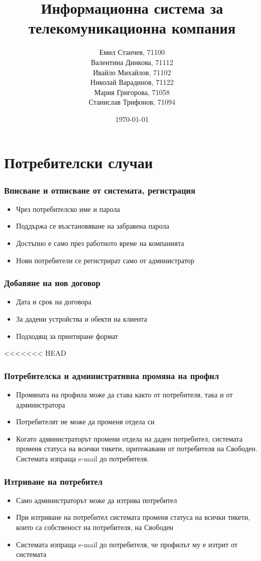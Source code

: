 \documentclass{beamer}
\title[ИС за телекомуникационна компания]{Информационна система за телекомуникационна компания}
\author{\tiny {Емил Станчев, 71100 \\
	Валентина Динкова, 71112 \\
	Ивайло Михайлов, 71102 \\
	Николай Варадинов, 71122 \\
	Мария Григорова, 71058 \\
	Станислав Трифонов, 71094 
	}
	}
\institute{ФМИ}
\date{\tiny{\today}}
\begin{document}
\begin{frame}
  \titlepage
\end{frame}

\section{Потребителски случаи}
\begin{frame}
  \frametitle{Вписване и отписване от системата, регистрация}
    \begin{itemize}
      \item Чрез потребителско име и парола
      \item Поддържа се възстановяване на забравена парола
      \item Достъпно е само през работното време на компанията
      \item Нови потребители се регистрират само от администратор
    \end{itemize}
\end{frame}

\begin{frame}
  \frametitle{Добавяне на нов договор}
    \begin{itemize}
	\item Дата и срок на договора
	\item За дадени устройства и обекти на клиента
	\item Подходящ за принтиране формат
    \end{itemize}
\end{frame}

<<<<<<< HEAD
\begin{frame}
  \frametitle{Потребителска и административна промяна на профил}
    \begin{itemize}
	\item Промяната на профила може да става както от потребителя, така и от администратора
	\item Потребителят не може да променя отдела си
	\item Когато администраторът промени отдела на даден потребител, системата променя статуса на всички тикети,
притежавани от потребителя на Свободен. Системата изпраща e-mail до потребителя.
    \end{itemize}
\end{frame}

\begin{frame}
  \frametitle{Изтриване на потребител}
    \begin{itemize}
	\item Само администраторът може да изтрива потребител
	\item При изтриване на потребител системата променя статуса на всички тикети,
 които са собственост на потребителя, на Свободен
	\item Системата изпраща e-mail до потребителя, че профилът му е изтрит от системата

    \end{itemize}
\end{frame}
\end{document}
